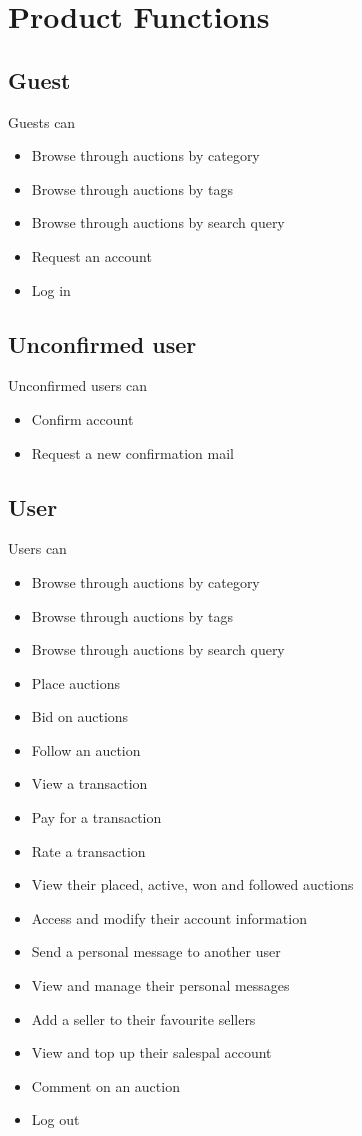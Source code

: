 \section{Product Functions}

	\subsection{Guest}
		Guests can
		\begin{itemize}
			\item Browse through auctions by category
			\item Browse through auctions by tags
			\item Browse through auctions by search query
			\item Request an account
			\item Log in
		\end{itemize}
	\subsection{Unconfirmed user}
		Unconfirmed users can
		\begin{itemize}
			\item Confirm account
			\item Request a new confirmation mail
		\end{itemize}
	\subsection{User}
		Users can
		\begin{itemize}
			\item Browse through auctions by category
			\item Browse through auctions by tags
			\item Browse through auctions by search query
			\item Place auctions
			\item Bid on auctions
			\item Follow an auction
			\item View a transaction
			\item Pay for a transaction
			\item Rate a transaction
			\item View their placed, active, won and followed auctions
			\item Access and modify their account information
			\item Send a personal message to another user
			\item View and manage their personal messages
			\item Add a seller to their favourite sellers
			\item View and top up their salespal account
			\item Comment on an auction
			\item Log out
		\end{itemize}

